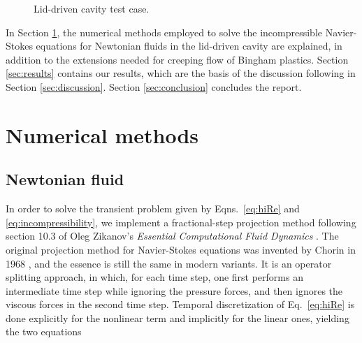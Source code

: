 \documentclass[final,3p,twocolumn]{elsarticle}
\begin{document}
\begin{figure}[htb]
    \centering
    \caption{Lid-driven cavity test case.}
    \label{fig:lidDrivenCavity}
\end{figure}

In Section \ref{sec:numerical}, the numerical methods employed to solve the
incompressible Navier-Stokes equations for Newtonian fluids in the lid-driven
cavity are explained, in addition to the extensions needed for creeping flow of
Bingham plastics. Section \ref{sec:results} contains our results, which are the
basis of the discussion following in Section \ref{sec:discussion}. Section
\ref{sec:conclusion} concludes the report. 

\section{Numerical methods}
\label{sec:numerical}

\subsection{Newtonian fluid}
\label{subsec:newtonian}

In order to solve the transient problem given by Eqns.\ \eqref{eq:hiRe} and
\eqref{eq:incompressibility}, we implement a fractional-step projection method
following section 10.3 of Oleg Zikanov's {\em Essential Computational Fluid
Dynamics} \cite{zikanov2010essential}. The original projection method for
Navier-Stokes equations was invented by Chorin in 1968
\cite{chorin1968numerical}, and the essence is still the same in modern
variants. It is an operator splitting approach, in which, for each time step,
one first performs an intermediate time step while ignoring the pressure
forces, and then ignores the viscous forces in the second time step.
Temporal discretization of Eq. \eqref{eq:hiRe} is done explicitly for the
nonlinear term and implicitly for the linear ones, yielding the two equations 
\end{document}
